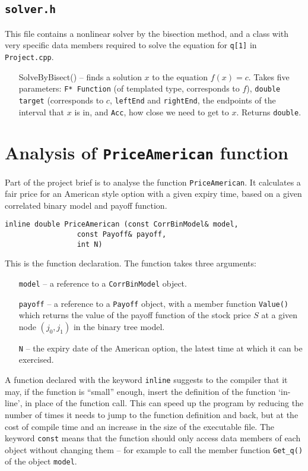 \documentclass[12pt,a4paper]{article}
\begin{document}
\subsection{\texttt{solver.h}}\label{section:solver} 
This file contains a nonlinear solver by the bisection method, and a class with 
very specific data members required to solve the equation for \texttt{q[1]} in 
\texttt{Project.cpp}. 
\begin{itemize}
	\item[SolveByBisect()] -- finds a solution $x$ to the equation $f(x) = c$. 
Takes five parameters: \texttt{F* Function} (of templated type, corresponds to 
$f$), \texttt{double target} (corresponds to $c$, \texttt{leftEnd} and 
\texttt{rightEnd}, the endpoints of the interval that $x$ is in, and 
\texttt{Acc}, how close we need to get to $x$. Returns \texttt{double}.
\end{itemize}

\section{Analysis of \texttt{PriceAmerican} function}\label{section:american}
Part of the project brief is to analyse the function \texttt{PriceAmerican}. 
It calculates a fair price for an American style option with a given expiry 
time, based on a given correlated binary model and payoff function.

\begin{lstlisting}
inline double PriceAmerican (const CorrBinModel& model, 
			     const Payoff& payoff, 
			     int N)
\end{lstlisting}
This is the function declaration. 
The function takes three arguments:
\begin{itemize}
	\item[\texttt{model}] -- a reference to a \texttt{CorrBinModel} object.
	\item[\texttt{payoff}] -- a reference to a \texttt{Payoff} object, with a 
member function \texttt{Value()} which returns the value of the payoff function 
of the stock price $S$ at a given node $(j_0,j_1)$ in the binary tree model.
	\item[\texttt{N}] -- the expiry date of the American option, the latest time at 
which it can be exercised.
\end{itemize}
A function declared with the keyword \texttt{inline} suggests to the compiler 
that it may, if the function is ``small'' enough, insert the definition of the 
function `in-line', in place of the function call. This can speed up the program 
by reducing the number of times it needs to jump to the function definition and 
back, but at the cost of compile time and an increase in the size of the 
executable file. The keyword \texttt{const} means that the function should only 
access data members of each object without changing them -- for example to call 
the member function \texttt{Get\_q()} of the object \texttt{model}.
\end{document}
